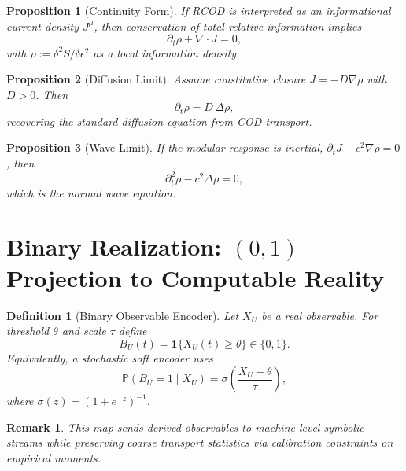 \documentclass[11pt, a4paper]{article}
\newtheorem{definition}{Definition}
\newtheorem{proposition}{Proposition}
\newtheorem{remark}{Remark}
\begin{document}
\begin{proposition}[Continuity Form]
If RCOD is interpreted as an informational current density $J^\mu$, then conservation of total relative information implies
\begin{equation}
\partial_t \rho + \nabla\cdot J = 0,
\end{equation}
with $\rho := \delta^2 S/\delta\epsilon^2$ as a local information density.
\end{proposition}

\begin{proposition}[Diffusion Limit]
Assume constitutive closure $J = -D\nabla\rho$ with $D>0$. Then
\begin{equation}
\partial_t \rho = D\,\Delta\rho,
\end{equation}
recovering the standard diffusion equation from COD transport.
\end{proposition}

\begin{proposition}[Wave Limit]
If the modular response is inertial, $\partial_t J + c^2\nabla\rho = 0$, then
\begin{equation}
\partial_t^2\rho - c^2\Delta\rho = 0,
\end{equation}
which is the normal wave equation.
\end{proposition}

\section{Binary Realization: $(0,1)$ Projection to Computable Reality}

\begin{definition}[Binary Observable Encoder]
Let $X_U$ be a real observable. For threshold $\theta$ and scale $\tau$ define
\begin{equation}
B_U(t)=\mathbf{1}\{X_U(t)\ge\theta\}\in\{0,1\}.
\end{equation}
Equivalently, a stochastic soft encoder uses
\begin{equation}
\mathbb{P}(B_U=1\mid X_U)=\sigma\!\left(\frac{X_U-\theta}{\tau}\right),
\end{equation}
where $\sigma(z)=(1+e^{-z})^{-1}$.
\end{definition}

\begin{remark}
This map sends derived observables to machine-level symbolic streams while preserving coarse transport statistics via calibration constraints on empirical moments.
\end{remark}
\end{document}
